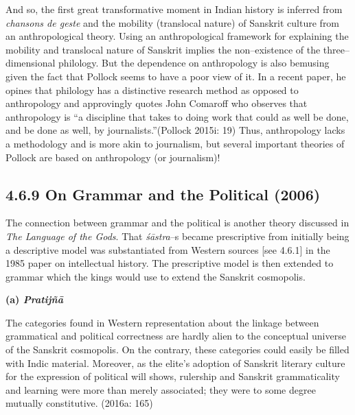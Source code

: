 And so, the first great transformative moment in Indian history is inferred from\textit{ chansons de geste} and the mobility (translocal nature) of Sanskrit culture from an anthropological theory. Using an anthropological framework for explaining the mobility and translocal nature of Sanskrit implies the non–existence of the three–dimensional philology. But the dependence on anthropology is also bemusing given the fact that Pollock seems to have a poor view of it. In a recent paper, he opines that philology has a distinctive research method as opposed to anthropology and approvingly quotes John Comaroff who observes that anthropology is “a discipline that takes to doing work that could as well be done, and be done as well, by journalists.”(Pollock 2015i: 19) Thus, anthropology lacks a methodology and is more akin to journalism, but several important theories of Pollock are based on anthropology (or journalism)!


\subsection*{4.6.9 On Grammar and the Political (2006)}

The connection between grammar and the political is another theory discussed in \textit{The Language of the Gods}. That \textit{śāstra}–s became prescriptive from initially being a descriptive model was substantiated from Western sources [see 4.6.1] in the 1985 paper on intellectual history. The prescriptive model is then extended to grammar which the kings would use to extend the Sanskrit cosmopolis.

\textbf{(a) \textit{Pratijñā }}

\begin{myquote}
The categories found in Western representation about the linkage between grammatical and political correctness are hardly alien to the conceptual universe of the Sanskrit cosmopolis. On the contrary, these categories could easily be ﬁlled with Indic material. Moreover, as the elite’s adoption of Sanskrit literary culture for the expression of political will shows, rulership and Sanskrit grammaticality and learning were more than merely associated; they were to some degree mutually constitutive. (2016a: 165)
\end{myquote}

